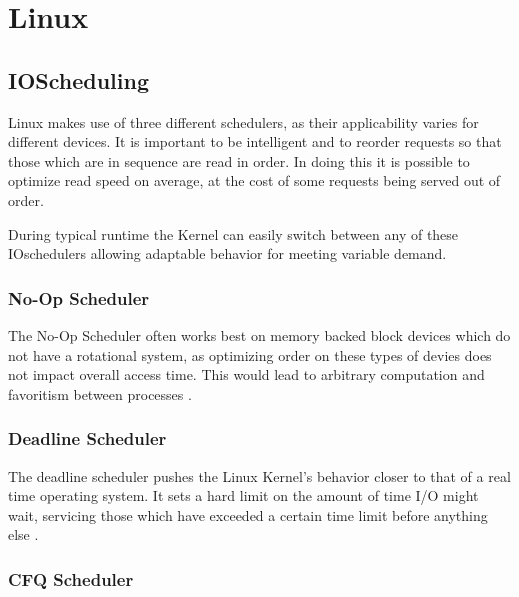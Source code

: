 \documentclass[letterpaper,10pt,notitlepage,fleqn]{article}
\begin{document}
\section{Linux}




\subsection{IOScheduling}


Linux makes use of three different schedulers, as their applicability varies for 
different devices. It is important to be intelligent and to reorder requests so that those
which are in sequence are read in order. In doing this it is possible to optimize read speed
on average, at the cost of some requests being served out of order. 

During typical runtime the Kernel can easily switch between any of these IOschedulers
allowing adaptable behavior for meeting variable demand.

\subsubsection{No-Op Scheduler}

The No-Op Scheduler often works best on memory backed block devices which do not have a rotational
system, as optimizing order on these types of devies does not impact overall access time. This would
lead to arbitrary computation and favoritism between processes \cite{stackDisc}. 


\subsubsection{Deadline Scheduler}

The deadline scheduler pushes the Linux Kernel's behavior closer to that of a real time 
operating system. It sets a hard limit on the amount of time I/O might wait, servicing 
those which have exceeded a certain time limit before anything else \cite{stackDisc}. 

\subsubsection{CFQ Scheduler}
\end{document}
